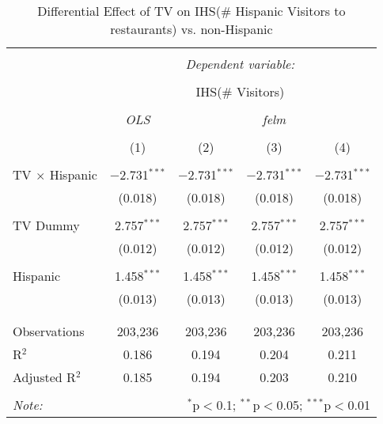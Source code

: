
\begin{table}[!htbp] \centering 
  \caption{Differential Effect of TV on IHS(\# Hispanic Visitors to restaurants) vs. non-Hispanic} 
  \label{} 
\begin{tabular}{@{\extracolsep{-2pt}}lcccc} 
\\[-1.8ex]\hline 
\hline \\[-1.8ex] 
 & \multicolumn{4}{c}{\textit{Dependent variable:}} \\ 
\cline{2-5} 
\\[-1.8ex] & \multicolumn{4}{c}{IHS(\# Visitors)} \\ 
\\[-1.8ex] & \textit{OLS} & \multicolumn{3}{c}{\textit{felm}} \\ 
\\[-1.8ex] & (1) & (2) & (3) & (4)\\ 
\hline \\[-1.8ex] 
 TV $\times$ Hispanic & $-$2.731$^{***}$ & $-$2.731$^{***}$ & $-$2.731$^{***}$ & $-$2.731$^{***}$ \\ 
  & (0.018) & (0.018) & (0.018) & (0.018) \\ 
  & & & & \\ 
 TV Dummy & 2.757$^{***}$ & 2.757$^{***}$ & 2.757$^{***}$ & 2.757$^{***}$ \\ 
  & (0.012) & (0.012) & (0.012) & (0.012) \\ 
  & & & & \\ 
 Hispanic & 1.458$^{***}$ & 1.458$^{***}$ & 1.458$^{***}$ & 1.458$^{***}$ \\ 
  & (0.013) & (0.013) & (0.013) & (0.013) \\ 
  & & & & \\ 
\hline \\[-1.8ex] 
Observations & 203,236 & 203,236 & 203,236 & 203,236 \\ 
R$^{2}$ & 0.186 & 0.194 & 0.204 & 0.211 \\ 
Adjusted R$^{2}$ & 0.185 & 0.194 & 0.203 & 0.210 \\ 
\hline 
\hline \\[-1.8ex] 
\textit{Note:}  & \multicolumn{4}{r}{$^{*}$p$<$0.1; $^{**}$p$<$0.05; $^{***}$p$<$0.01} \\ 
\end{tabular} 
\end{table} 
